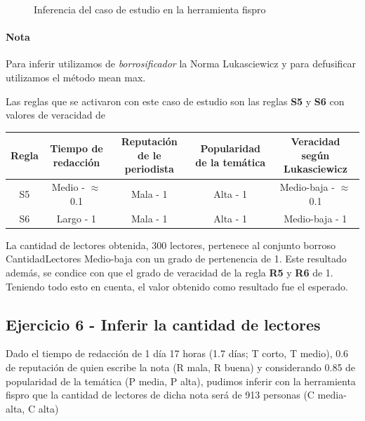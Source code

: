 \documentclass{article}
\begin{document}
\begin{itemize}
\begin{figure}[H]
	\centering
	\caption{Inferencia del caso de estudio en la herramienta fispro}
\end{figure}

\paragraph{Nota} Para inferir utilizamos de \textit{borrosificador} la Norma Lukasciewicz
y para defusificar utilizamos el método mean max.

\vspace{3mm}
Las reglas que se activaron con este caso de estudio son las reglas \textbf{S5} y \textbf{S6} con valores de veracidad de

\begin{table}[H]
	\centering
	\begin{tabular}{c|c c c|c}
		Regla&Tiempo de redacción&Reputación de le periodista&Popularidad de la temática&Veracidad según Lukasciewicz\\
		\hline
		S5&Medio - $\approx$0.1&Mala - 1&Alta - 1&Medio-baja - $\approx$0.1\footnotemark\\
		S6&Largo - 1&Mala - 1&Alta - 1&Medio-baja - 1\footnotemark\\
	\end{tabular}
\end{table}


La cantidad de lectores obtenida, 300 lectores, pertenece al conjunto borroso CantidadLectores Medio-baja con un grado de pertenencia de 1. Este resultado además, se condice con que el grado de veracidad de la regla \textbf{R5} y \textbf{R6} de 1. Teniendo todo esto en cuenta, el valor obtenido como resultado fue el esperado.

\pagebreak
\subsection*{Ejercicio 6 - Inferir la cantidad de lectores}

Dado el tiempo de redacción de 1 día 17 horas (1.7 días; T corto, T medio), 0.6 de reputación de quien escribe la nota (R mala, R buena) y considerando 0.85 de popularidad de la temática (P media, P alta), pudimos inferir con la herramienta fispro que la cantidad de lectores de dicha nota será de 913 personas (C media-alta, C alta)


\end{itemize}
\end{document}
